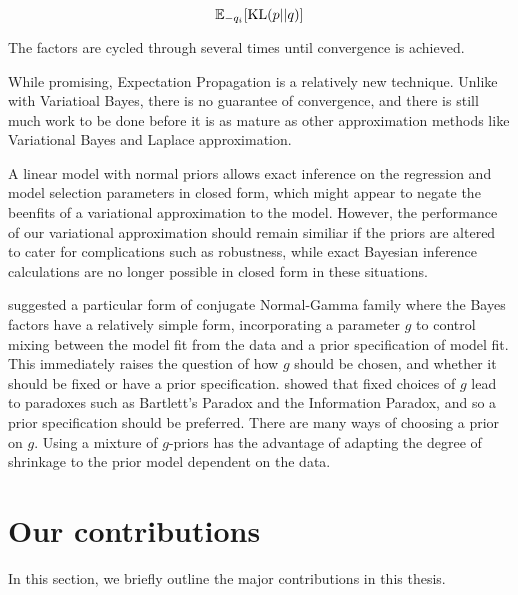 \[
	{\mathbb E}_{-q_i} [\text{KL}(p || q)]
\]

The factors are cycled through several times until convergence is achieved.

While promising, Expectation Propagation is a relatively new technique.  Unlike
with Variatioal Bayes, there is no guarantee of convergence, and there is still
much work to be done before it is as mature as other approximation methods like
Variational Bayes and Laplace approximation.

A linear model with normal priors allows exact inference on the regression and
model selection parameters in closed form, which might appear to negate the
beenfits of a variational approximation to the model. However, the performance
of our variational approximation should remain similiar if the priors are
altered to cater for complications such as robustness, while exact Bayesian
inference calculations are no longer possible in closed form in these
situations.

\cite{Zellner1986} suggested a particular form of conjugate Normal-Gamma family
where the Bayes factors have a relatively simple form, incorporating a parameter
$g$ to control mixing between the model fit from the data and a prior
specification of model fit. This immediately raises the question of how $g$
should be chosen, and whether it should be fixed or have a prior specification.
\cite{Liang2008} showed that fixed choices of $g$ lead to paradoxes such as
Bartlett's Paradox and the Information Paradox, and so a prior specification
should be preferred. There are many ways of choosing a prior on $g$. Using a
mixture of $g$-priors has the advantage of adapting the degree of shrinkage to
the prior model dependent on the data.

\section{Our contributions}

In this section, we briefly outline the major contributions in this thesis.

